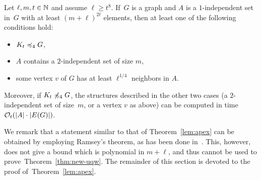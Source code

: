 \begin{lemma}\label{lem:apex}
Let $\ell,m,t\in \mathbb{N}$ and assume $\ell\geq t^{8}$. 
If~$G$ is a graph and $A$ is a $1$-independent set in~$G$
with at least $(m+\ell)^{2t}$ elements,
then at least one of the following conditions hold:
\begin{itemize}
  \item $K_t\preccurlyeq_{4} G$,
\item  $A$ contains a $2$-independent set of size $m$, 
\item  some vertex $v$ of $G$
has at least $\ell^{1/4}$ neighbors in $A$.
\end{itemize}
Moreover, if $K_t\not\preccurlyeq_4G$, the
structures described in the other two cases (a $2$-independent set 
of size~$m$, or a vertex $v$ as above) can be 
computed in time $\mathcal{O}_t(|A|\cdot |E(G)|)$. 
\end{lemma}
We remark that a statement similar to that of Theorem~\ref{lem:apex}
can be obtained by employing Ramsey's theorem, as has been done in~\cite{nevsetvril2010first}. This, however, 
does not give a bound which is polynomial in $m+\ell$, and thus cannot be used to prove~Theorem~\ref{thm:new-uqw}.
%
The remainder of this section is devoted to the proof of~Theorem~\ref{lem:apex}.
%
%
